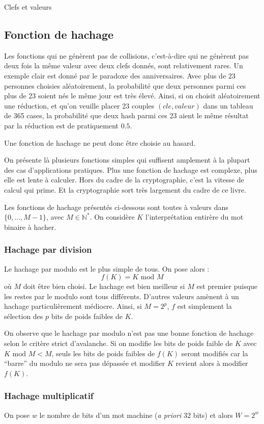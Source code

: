 \documentclass[../../../main.tex]{subfiles}
\begin{document}
\begin{definition}{Clefs et valeurs}
\subsection{Fonction de hachage}
Les fonctions qui ne génèrent pas de collisions, c'est-à-dire qui ne génèrent pas deux fois la même valeur avec deux clefs donnés, sont relativement rares. Un exemple clair est donné par le paradoxe des anniversaires. Avec plus de 23 personnes choisies aléatoirement, la probabilité que deux personnes parmi ces plus de 23 soient nés le même jour est très élevé. Ainsi, si on choisit aléatoirement une réduction, et qu'on veuille placer 23 couples $(cle, valeur)$ dans un tableau de 365 cases, la probabilité que deux hash parmi ces 23 aient le même résultat par la réduction est de pratiquement $0.5$.

Une fonction de hachage ne peut donc être choisie au hasard.

On présente là plusieurs fonctions simples qui suffisent amplement à la plupart des cas d'applications pratiques. Plus une fonction de hachage est complexe, plus elle est lente à calculer. Hors du cadre de la cryptographie, c'est la vitesse de calcul qui prime. Et la cryptographie sort très largement du cadre de ce livre.

Les fonctions de hachage présentés ci-dessous sont toutes à valeurs dans $\{0, \dots, M-1\}$, avec $M\in{\mathbb{N}^*}$. On considère $K$ l'interprétation entirère du mot binaire à hacher.
\subsubsection{Hachage par division}
Le hachage par modulo est le plus simple de tous.  On pose alors :
$$f(K) = K\text{ mod } M$$
où $M$ doit être bien choisi. Le hachage est bien meilleur si $M$ est premier puisque les restes par le modulo sont tous différents. D'autres valeurs amènent à un hachage particulièrement médiocre. Ainsi, si $M = 2^p$, $f$ est simplement la sélection des $p$ bits de poids faibles de $K$.

On observe que le hachage par modulo n'est pas une bonne fonction de hachage selon le critère strict d'avalanche. Si on modifie les bits de poids faible de $K$ avec $K\text{ mod }M < M$, seuls les bits de poids faibles de $f(K)$ seront modifiés car la ``barre'' du modulo ne sera pas dépassée et modifier $K$ revient alors à modifier $f(K)$.
\subsubsection{Hachage multiplicatif}
On pose $w$ le nombre de bits d'un mot machine (\textit{a priori} 32 bits) et alors $W = 2^w$


\end{definition}
\end{document}
